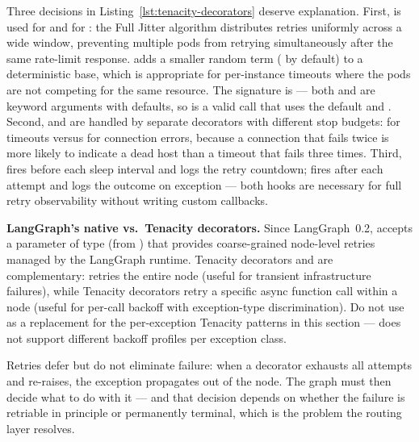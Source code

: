 Three decisions in Listing~\ref{lst:tenacity-decorators} deserve
explanation. First,  is used for
 and  for
: the Full Jitter algorithm distributes retries uniformly
across a wide window, preventing multiple pods from retrying simultaneously
after the same rate-limit response.  adds a
smaller random term ( by default) to a
deterministic base, which is appropriate for per-instance timeouts where
the pods are not competing for the same resource. The 
signature is  --- both 
and  are keyword arguments with defaults, so
 is a valid call that
uses the default  and . Second,
 and  are handled by separate
decorators with different stop budgets:
 for timeouts versus
 for connection errors, because a connection
that fails twice is more likely to indicate a dead host than a timeout that
fails three times. Third,  fires before each sleep
interval and logs the retry countdown;  fires after each
attempt and logs the outcome on exception --- both hooks are necessary for
full retry observability without writing custom callbacks.

\begin{notebox}
  \textbf{LangGraph's native  vs.\ Tenacity decorators.}
  Since LangGraph~0.2,  accepts a 
  parameter of type  (from )
  that provides coarse-grained node-level retries managed by the LangGraph
  runtime. Tenacity decorators and  are complementary:
   retries the entire node (useful for transient
  infrastructure failures), while Tenacity decorators retry a specific
  async function call within a node (useful for per-call backoff with
  exception-type discrimination). Do not use  as a
  replacement for the per-exception Tenacity patterns in this section ---
   does not support different backoff profiles per
  exception class.
\end{notebox}

Retries defer but do not eliminate failure: when a decorator exhausts all
attempts and re-raises, the exception propagates out of the node. The graph
must then decide what to do with it --- and that decision depends on whether
the failure is retriable in principle or permanently terminal, which is the
problem the routing layer resolves.

